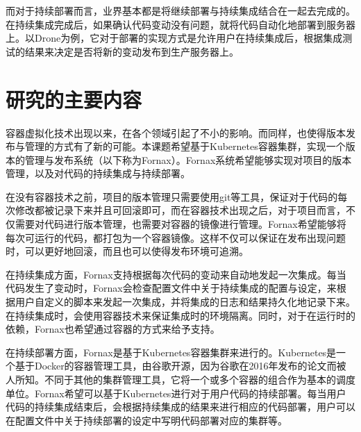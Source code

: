 而对于持续部署而言，业界基本都是将继续部署与持续集成结合在一起去完成的。在持续集成完成后，如果确认代码变动没有问题，就将代码自动化地部署到服务器上。以Drone为例，它对于部署的实现方式是允许用户在持续集成后，根据集成测试的结果来决定是否将新的变动发布到生产服务器上。

\section{研究的主要内容}

容器虚拟化技术出现以来，在各个领域引起了不小的影响。而同样，也使得版本发布与管理的方式有了新的可能。本课题希望基于Kubernetes容器集群，实现一个版本的管理与发布系统（以下称为Fornax）。Fornax系统希望能够实现对项目的版本管理，以及对代码的持续集成与持续部署。

在没有容器技术之前，项目的版本管理只需要使用git等工具，保证对于代码的每次修改都被记录下来并且可回滚即可，而在容器技术出现之后，对于项目而言，不仅需要对代码进行版本管理，也需要对容器的镜像进行管理。Fornax希望能够将每次可运行的代码，都打包为一个容器镜像。这样不仅可以保证在发布出现问题时，可以更好地回滚，而且也可以使得发布环境可追溯。

在持续集成方面，Fornax支持根据每次代码的变动来自动地发起一次集成。每当代码发生了变动时，Fornax会检查配置文件中关于持续集成的配置与设定，来根据用户自定义的脚本来发起一次集成，并将集成的日志和结果持久化地记录下来。在持续集成时，会使用容器技术来保证集成时的环境隔离。同时，对于在运行时的依赖，Fornax也希望通过容器的方式来给予支持。

在持续部署方面，Fornax是基于Kubernetes容器集群来进行的。Kubernetes是一个基于Docker的容器管理工具，由谷歌开源，因为谷歌在2016年发布的论文\supercite{Borg}而被人所知。不同于其他的集群管理工具，它将一个或多个容器的组合作为基本的调度单位。Fornax希望可以基于Kubernetes进行对于用户代码的持续部署。每当用户代码的持续集成结束后，会根据持续集成的结果来进行相应的代码部署，用户可以在配置文件中关于持续部署的设定中写明代码部署对应的集群等。